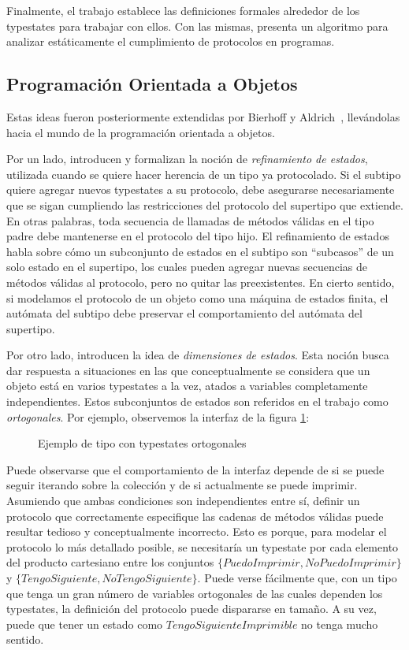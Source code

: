 Finalmente, el trabajo establece las definiciones formales alrededor de los typestates para trabajar con ellos. Con las mismas, presenta un algoritmo para analizar estáticamente el cumplimiento de protocolos en programas.

\subsection{Programación Orientada a Objetos}
\label{teorico:objetos}

Estas ideas fueron posteriormente extendidas por Bierhoff y Aldrich~\cite{Lightweight}, llevándolas hacia el mundo de la programación orientada a objetos.

Por un lado, introducen y formalizan la noción de \textit{refinamiento de estados}, utilizada cuando se quiere hacer herencia de un tipo ya protocolado. Si el subtipo quiere agregar nuevos typestates a su protocolo, debe asegurarse necesariamente que se sigan cumpliendo las restricciones del protocolo del supertipo que extiende. En otras palabras, toda secuencia de llamadas de métodos válidas en el tipo padre debe mantenerse en el protocolo del tipo hijo. El refinamiento de estados habla sobre cómo un subconjunto de estados en el subtipo son ``subcasos'' de un solo estado en el supertipo, los cuales pueden agregar nuevas secuencias de métodos válidas al protocolo, pero no quitar las preexistentes. En cierto sentido, si modelamos el protocolo de un objeto como una máquina de estados finita, el autómata del subtipo debe preservar el comportamiento del autómata del supertipo.

Por otro lado, introducen la idea de \textit{dimensiones de estados}. Esta noción busca dar respuesta a situaciones en las que conceptualmente se considera que un objeto está en varios typestates a la vez, atados a variables completamente independientes. Estos subconjuntos de estados son referidos en el trabajo como \textit{ortogonales}. Por ejemplo, observemos la interfaz de la figura \ref{teorico:ortogonal}:

\begin{figure}[htbp]
    \centering
    
    \caption{Ejemplo de tipo con typestates ortogonales}
    \label{teorico:ortogonal}
\end{figure}

Puede observarse que el comportamiento de la interfaz depende de si se puede seguir iterando sobre la colección y de si actualmente se puede imprimir. Asumiendo que ambas condiciones son independientes entre sí, definir un protocolo que correctamente especifique las cadenas de métodos válidas puede resultar tedioso y conceptualmente incorrecto. Esto es porque, para modelar el protocolo lo más detallado posible, se necesitaría un typestate por cada elemento del producto cartesiano entre los conjuntos $\{\mathit{PuedoImprimir}, \mathit{NoPuedoImprimir}\}$ y $\{\mathit{TengoSiguiente}, \mathit{NoTengoSiguiente}\}$. Puede verse fácilmente que, con un tipo que tenga un gran número de variables ortogonales de las cuales dependen los typestates, la definición del protocolo puede dispararse en tamaño. A su vez, puede que tener un estado como $\mathit{TengoSiguienteImprimible}$ no tenga mucho sentido.

